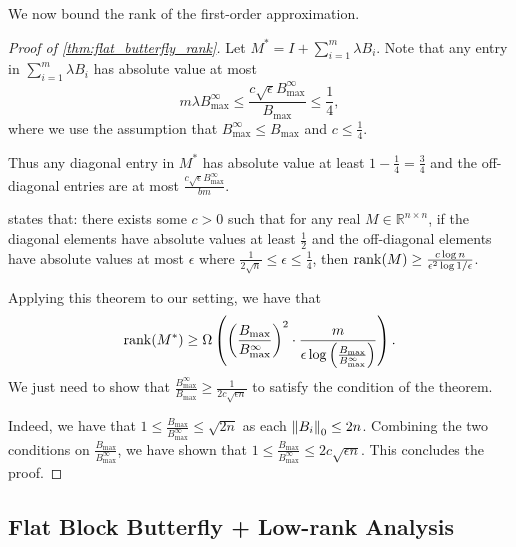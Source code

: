 We now bound the rank of the first-order approximation.
\begin{proof}[Proof of \cref{thm:flat_butterfly_rank}]
  Let $M^* = I + \sum_{i=1}^{m} \lambda B_i$.
  Note that any entry in $\sum_{i=1}^{m} \lambda B_i$ has absolute value at most
  \begin{equation*}
    m \lambda B^\infty_\mathrm{max} \leq \frac{c \sqrt{\epsilon} B^\infty_\mathrm{max}}{B_\mathrm{max}} \leq \frac{1}{4},
  \end{equation*}
  where we use the assumption that $B^\infty_\mathrm{max} \leq B_\mathrm{max}$
  and $c \leq \frac{1}{4}$.

  Thus any diagonal entry in $M^*$ has absolute value at least
  $1 - \frac{1}{4} = \frac{3}{4}$ and the off-diagonal entries are at most
  $\frac{c \sqrt{\epsilon}B^\infty_\mathrm{max}}{bm}$.

  \citet[Theorem 1.1]{alon2009perturbed} states that: there exists some $c > 0$
  such that for any real $M \in \mathbb{R}^{n \times n}$, if the diagonal
  elements have absolute values at least $\frac{1}{2}$ and the off-diagonal
  elements have absolute values at most $\epsilon$ where
  $\frac{1}{2 \sqrt{n}} \leq \epsilon \leq \frac{1}{4}$, then
  $\mathrm{rank}(M) \geq \frac{c \log n}{\epsilon^2 \log 1/\epsilon}$.

  Applying this theorem to our setting, we have that
  \begin{equation*}
    \mathrm{rank}(M^*) \geq \Omega \left( \left( \frac{B_\mathrm{max}}{B^\infty_\mathrm{max}} \right)^2 \cdot \frac{m}{\epsilon \log \left( \frac{B_\mathrm{max}}{B^\infty_\mathrm{max}} \right) }\right).
  \end{equation*}
  We just need to show that
  $\frac{B^\infty_\mathrm{max}}{B_\mathrm{max}} \geq \frac{1}{2 c \sqrt{\epsilon n}}$
  to satisfy the condition of the theorem.

  Indeed, we have that
  $1 \leq \frac{B_\mathrm{max}}{B^\infty_\mathrm{max}} \leq \sqrt{2n}$ as each
  $\left\|{B_i}\right\|_0 \leq 2n$.
  Combining the two conditions on
  $\frac{B_\mathrm{max}}{B^\infty_\mathrm{max}}$, we have shown that
  $1 \leq \frac{B_\mathrm{max}}{B^\infty_\mathrm{max}} \leq 2 c \sqrt{\epsilon n}$.
  This concludes the proof.
\end{proof}


\subsection{Flat Block Butterfly + Low-rank Analysis}
\label{subsec:flat_butterfly_lr_proofs}


